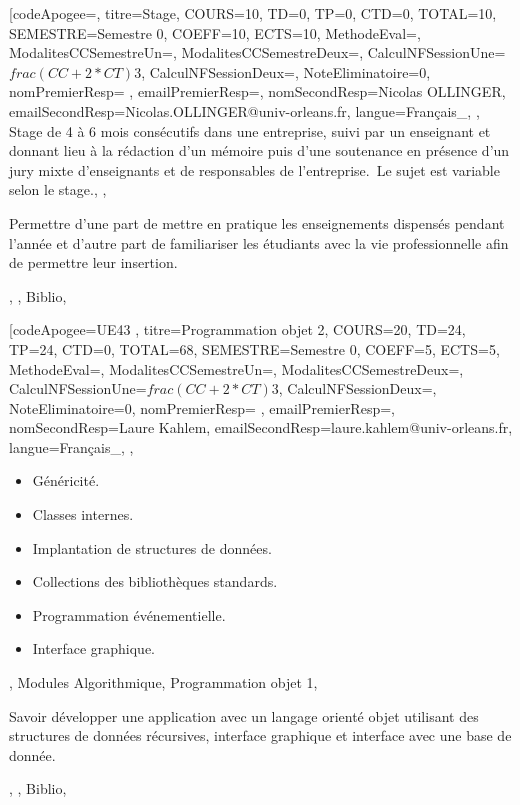 \vfill


\module[codeApogee={},
titre={Stage},
COURS={10},
TD={0},
TP={0},
CTD={0},
TOTAL={10},
SEMESTRE={Semestre 0},
COEFF={10},
ECTS={10},
MethodeEval={},
ModalitesCCSemestreUn={},
ModalitesCCSemestreDeux={},
CalculNFSessionUne={$frac{(CC+2*CT)}{3}$},
CalculNFSessionDeux={},
NoteEliminatoire={0},
nomPremierResp={ },
emailPremierResp={},
nomSecondResp={Nicolas OLLINGER},
emailSecondResp={Nicolas.OLLINGER@univ-orleans.fr},
langue={Français_},
{},
{Stage de 4 à 6 mois consécutifs dans une entreprise, suivi par un enseignant et donnant lieu à la rédaction d'un mémoire puis 
d'une soutenance en présence d'un jury mixte d'enseignants et de responsables de l'entreprise.\
Le sujet est variable selon le stage.},
{},
{\begin{itemize}
\ObjItem Permettre d'une part de mettre en pratique les enseignements dispensés pendant l'année et d'autre part de familiariser 
  les étudiants avec la vie professionnelle afin de permettre leur insertion.
\end{itemize}},
{},
{Biblio},

\vfill


\module[codeApogee={UE43 },
titre={Programmation objet 2},
COURS={20},
TD={24},
TP={24},
CTD={0},
TOTAL={68},
SEMESTRE={Semestre 0},
COEFF={5},
ECTS={5},
MethodeEval={},
ModalitesCCSemestreUn={},
ModalitesCCSemestreDeux={},
CalculNFSessionUne={$frac{(CC+2*CT)}{3}$},
CalculNFSessionDeux={},
NoteEliminatoire={0},
nomPremierResp={ },
emailPremierResp={},
nomSecondResp={Laure Kahlem},
emailSecondResp={laure.kahlem@univ-orleans.fr},
langue={Français_},
{},
{\begin{itemize}
\item Généricité.
  \item Classes internes.
  \item Implantation de structures de données.
  \item Collections des bibliothèques standards.
  \item Programmation événementielle.
  \item Interface graphique.
\end{itemize}},
{Modules Algorithmique, Programmation objet 1},
{\begin{itemize}
\ObjItem Savoir développer une application avec un langage orienté objet utilisant des structures de données récursives, interface graphique et interface avec une base de donnée.
\end{itemize}},
{},
{Biblio},

\vfill



